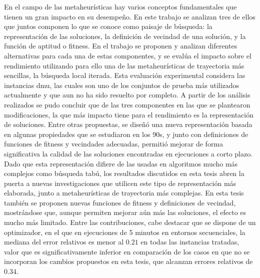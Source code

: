 En el campo de las metaheurísticas hay varios conceptos fundamentales que tienen un gran impacto en su desempeño.
%
En este trabajo se analizan tres de ellos que juntos componen lo que se conoce como paisaje de búsqueda: la representación de las soluciones, 
la definición de vecindad de una solución, y la función de aptitud o fitness. 
%
En el trabajo se proponen y analizan diferentes alternativas para cada una de estas componentes, y se evalúa el impacto sobre el rendimiento utilizando
para ello una de las metaheurísticas de trayectoria más sencillas, la búsqueda local iterada.
%
Esta evaluación experimental considera las instancias dmu, las cuales son uno de los conjuntos de prueba más utilizados actualmente y que aun no ha
sido resuelto por completo.
%
A partir de los análisis realizados se pudo concluir que de las tres componentes en las que se plantearon modificaciones, la que más impacto tiene para el
rendimiento es la representación de soluciones.
%
Entre otras propuestas, se diseñó una nueva representación basada en algunas propiedades que se estudiaron en los 90s, y junto con definiciones
de funciones de fitness y vecindades adecuadas, permitió mejorar de forma significativa la calidad de las soluciones encontradas en ejecuciones a corto plazo. 
%
Dado que esta representación difiere de las usadas en algoritmos mucho más complejos como búsqueda tabú, los resultados discutidos en esta tesis
abren la puerta a nuevas investigaciones que utilicen este tipo de representación más elaborada, junto a metaheurísticas de
trayectoria más complejas.
%
En esta tesis también se proponen nuevas funciones de fitness y definiciones de vecindad, mostrándose que, aunque permiten mejorar aún más las soluciones,
el efecto es mucho más limitado.
%
Entre las contribuciones, cabe destacar que se dispone de un optimizador, en el que en ejecuciones de 5 minutos en entornos secuenciales, 
la mediana del error relativos es menor al $0.21$ en todas las instancias tratadas, valor que es significativamente inferior en comparación de los casos 
en que no se incorporan los cambios propuestos en esta tesis, que alcanzan errores relativos de $0.34$.


\let\cleardoublepage\clearpage



